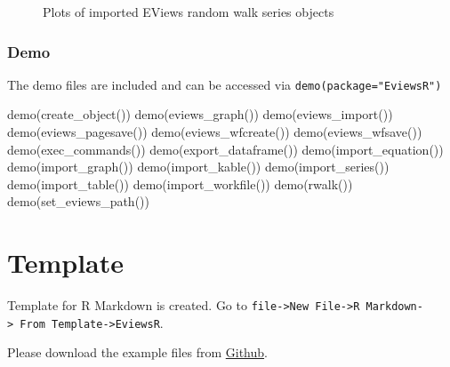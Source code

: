 \documentclass[
  letterpaper,
  DIV=11,
  numbers=noendperiod]{scrartcl}
\newenvironment{Shaded}{\begin{snugshade}}{\end{snugshade}}
\newcommand{\FunctionTok}[1]{\textcolor[rgb]{0.28,0.35,0.67}{#1}}
\newcommand{\NormalTok}[1]{\textcolor[rgb]{0.00,0.23,0.31}{#1}}
\begin{document}
\begin{figure}
\begin{minipage}[t]{0.50\linewidth}
{{}

\caption{\label{fig-rwalk-2}Plots of imported EViews random walk series
objects}

}

\end{minipage}%

\end{figure}

\hypertarget{demo}{%
\subsubsection{Demo}\label{demo}}

The demo files are included and can be accessed via
\texttt{demo(package="EviewsR")}

\begin{Shaded}
\begin{Highlighting}[]
\FunctionTok{demo}\NormalTok{(}\FunctionTok{create\_object}\NormalTok{())}
\FunctionTok{demo}\NormalTok{(}\FunctionTok{eviews\_graph}\NormalTok{())}
\FunctionTok{demo}\NormalTok{(}\FunctionTok{eviews\_import}\NormalTok{())}
\FunctionTok{demo}\NormalTok{(}\FunctionTok{eviews\_pagesave}\NormalTok{())}
\FunctionTok{demo}\NormalTok{(}\FunctionTok{eviews\_wfcreate}\NormalTok{())}
\FunctionTok{demo}\NormalTok{(}\FunctionTok{eviews\_wfsave}\NormalTok{())}
\FunctionTok{demo}\NormalTok{(}\FunctionTok{exec\_commands}\NormalTok{())}
\FunctionTok{demo}\NormalTok{(}\FunctionTok{export\_dataframe}\NormalTok{())}
\FunctionTok{demo}\NormalTok{(}\FunctionTok{import\_equation}\NormalTok{())}
\FunctionTok{demo}\NormalTok{(}\FunctionTok{import\_graph}\NormalTok{())}
\FunctionTok{demo}\NormalTok{(}\FunctionTok{import\_kable}\NormalTok{())}
\FunctionTok{demo}\NormalTok{(}\FunctionTok{import\_series}\NormalTok{())}
\FunctionTok{demo}\NormalTok{(}\FunctionTok{import\_table}\NormalTok{())}
\FunctionTok{demo}\NormalTok{(}\FunctionTok{import\_workfile}\NormalTok{())}
\FunctionTok{demo}\NormalTok{(}\FunctionTok{rwalk}\NormalTok{())}
\FunctionTok{demo}\NormalTok{(}\FunctionTok{set\_eviews\_path}\NormalTok{())}
\end{Highlighting}
\end{Shaded}

\begin{figure}

\end{figure}

\hypertarget{template}{%
\section{Template}\label{template}}

Template for R Markdown is created. Go to
\texttt{file-\textgreater{}New\ File-\textgreater{}R\ Markdown-\textgreater{}\ From\ Template-\textgreater{}EviewsR}.

Please download the example files from
\href{https://github.com/sagirumati/EviewsR/tree/master/inst/examples/}{Github}.
\end{document}
